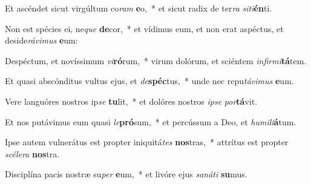 \item Et ascéndet sicut virgúltum co\textit{ram} \textbf{e}o,~* et sicut radix de ter\textit{ra} \textit{si}\textit{ti}\textbf{én}ti.
\item Non est spécies ei, ne\textit{que} \textbf{de}cor,~* et vídimus eum, et non erat aspéctus, et deside\textit{rá}\textit{vi}\textit{mus} \textbf{e}um:
\item Despéctum, et novíssimum \textit{vi}\textbf{ró}rum,~* virum dolórum, et sciéntem \textit{in}\textit{fir}\textit{mi}\textbf{tá}tem.
\item Et quasi abscónditus vultus ejus, et \textit{de}\textbf{spéc}tus,~* unde nec repu\textit{tá}\textit{vi}\textit{mus} \textbf{e}um.
\item Vere languóres nostros ip\textit{se} \textbf{tu}lit,~* et dolóres nostros \textit{ip}\textit{se} \textit{por}\textbf{tá}vit.
\item Et nos putávimus eum quasi \textit{le}\textbf{pró}sum,~* et percússum a Deo, et \textit{hu}\textit{mi}\textit{li}\textbf{á}tum.
\item Ipse autem vulnerátus est propter iniquitá\textit{tes} \textbf{nos}tras,~* attrítus est propter \textit{scé}\textit{le}\textit{ra} \textbf{nos}tra.
\item Disciplína pacis nostræ su\textit{per} \textbf{e}um,~* et livóre ejus \textit{sa}\textit{ná}\textit{ti} \textbf{su}mus.
